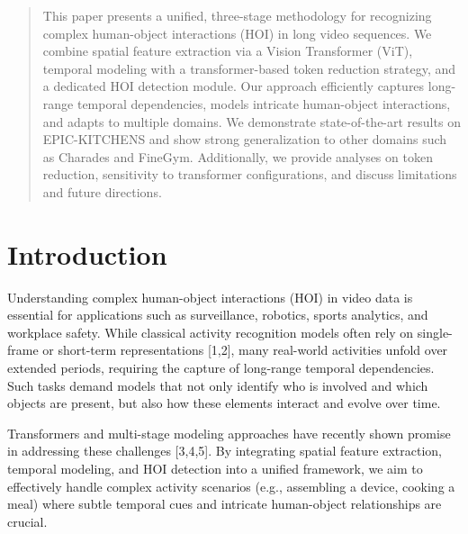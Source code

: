 \documentclass{article}
\begin{document}

\begin{abstract}
This paper presents a unified, three-stage methodology for recognizing complex human-object interactions (HOI) in long video sequences. We combine spatial feature extraction via a Vision Transformer (ViT), temporal modeling with a transformer-based token reduction strategy, and a dedicated HOI detection module. Our approach efficiently captures long-range temporal dependencies, models intricate human-object interactions, and adapts to multiple domains. We demonstrate state-of-the-art results on EPIC-KITCHENS and show strong generalization to other domains such as Charades and FineGym. Additionally, we provide analyses on token reduction, sensitivity to transformer configurations, and discuss limitations and future directions.
\end{abstract}

\section{Introduction}
Understanding complex human-object interactions (HOI) in video data is essential for applications such as surveillance, robotics, sports analytics, and workplace safety. While classical activity recognition models often rely on single-frame or short-term representations [1,2], many real-world activities unfold over extended periods, requiring the capture of long-range temporal dependencies. Such tasks demand models that not only identify who is involved and which objects are present, but also how these elements interact and evolve over time.

Transformers and multi-stage modeling approaches have recently shown promise in addressing these challenges [3,4,5]. By integrating spatial feature extraction, temporal modeling, and HOI detection into a unified framework, we aim to effectively handle complex activity scenarios (e.g., assembling a device, cooking a meal) where subtle temporal cues and intricate human-object relationships are crucial.
\end{document}
